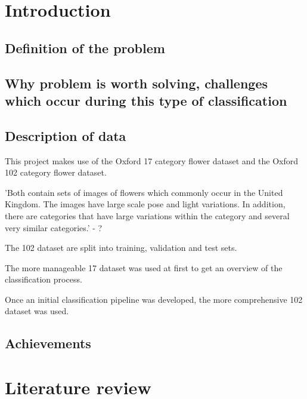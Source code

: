 \documentclass[11pt, a4paper]{report}
\begin{document}
\setlength{\parskip}{0.0cm}
\tableofcontents
\setlength{\parskip}{0.4cm}


\chapter{Introduction}

\section{Definition of the problem} 

\section{Why problem is worth solving, challenges which occur during this type of classification}

\section{Description of data}

This project makes use of the Oxford 17 category flower dataset and the Oxford 102 category flower dataset. 

'Both contain sets of images of flowers which commonly occur in the United Kingdom. The images have large scale pose and light variations. In addition, there are categories that have large variations within the category and several very similar categories.' - ?

The 102 dataset are split into training, validation and test sets.

The more manageable 17 dataset was used at first to get an overview of the classification process.

Once an initial classification pipeline was developed, the more comprehensive 102 dataset was used. 

\section{Achievements}






\chapter{Literature review}
\end{document}
